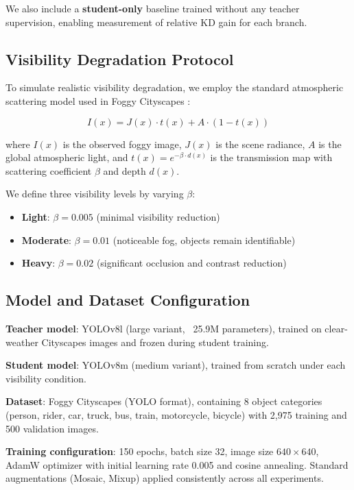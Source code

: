 We also include a \textbf{student-only} baseline trained without any teacher supervision, enabling measurement of relative KD gain for each branch.

\subsection{Visibility Degradation Protocol}

To simulate realistic visibility degradation, we employ the standard atmospheric scattering model used in Foggy Cityscapes \cite{sakaridis2018semantic}:

\begin{equation}
I(x) = J(x) \cdot t(x) + A \cdot (1 - t(x))
\end{equation}

where $I(x)$ is the observed foggy image, $J(x)$ is the scene radiance, $A$ is the global atmospheric light, and $t(x) = e^{-\beta \cdot d(x)}$ is the transmission map with scattering coefficient $\beta$ and depth $d(x)$.

We define three visibility levels by varying $\beta$:
\begin{itemize}
    \item \textbf{Light}: $\beta = 0.005$ (minimal visibility reduction)
    \item \textbf{Moderate}: $\beta = 0.01$ (noticeable fog, objects remain identifiable)
    \item \textbf{Heavy}: $\beta = 0.02$ (significant occlusion and contrast reduction)
\end{itemize}

\subsection{Model and Dataset Configuration}

\textbf{Teacher model}: YOLOv8l (large variant, ~25.9M parameters), trained on clear-weather Cityscapes images and frozen during student training.

\textbf{Student model}: YOLOv8m (medium variant), trained from scratch under each visibility condition.

\textbf{Dataset}: Foggy Cityscapes (YOLO format), containing 8 object categories (person, rider, car, truck, bus, train, motorcycle, bicycle) with 2,975 training and 500 validation images.

\textbf{Training configuration}: 150 epochs, batch size 32, image size $640 \times 640$, AdamW optimizer with initial learning rate 0.005 and cosine annealing. Standard augmentations (Mosaic, Mixup) applied consistently across all experiments.

